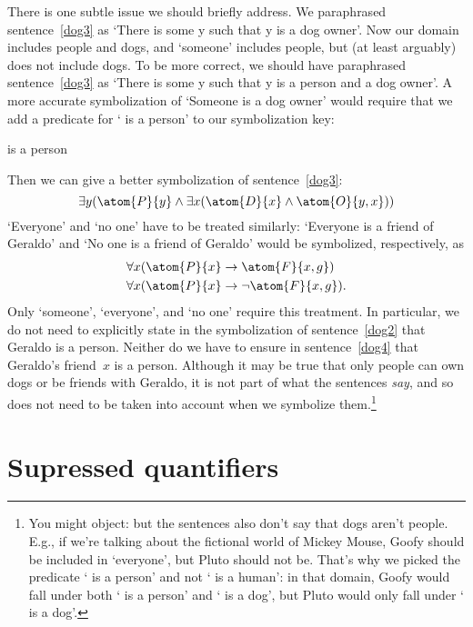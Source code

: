 There is one subtle issue we should briefly address. We paraphrased
sentence~\ref{dog3} as `There is some y such that y is a dog owner'.
Now our domain includes people and dogs, and `someone' includes
people, but (at least arguably) does not include dogs.  To be more
correct, we should have paraphrased sentence~\ref{dog3} as `There is
some y such that y is a person and a dog owner'. A more accurate
symbolization of `Someone is a dog owner' would require that we add a
predicate for `\blank{} is a person' to our symbolization key:
\begin{ekey}
	\item[\atom{P}{x}]  is a person
\end{ekey}
Then we can give a better symbolization of sentence~\ref{dog3}:
$$\exists y (\atom{P}{y} \eand \exists x(\atom{D}{x} \eand
\atom{O}{y,x}))$$
`Everyone' and `no one' have to be treated similarly: `Everyone
is a friend of Geraldo' and `No one is a friend of Geraldo' would be
symbolized, respectively, as
\begin{align*}
	& \forall x(\atom{P}{x} \eif \atom{F}{x,g})\\
	& \forall x(\atom{P}{x} \eif \enot\atom{F}{x,g}).
\end{align*}
Only `someone', `everyone', and `no one' require this treatment. In
particular, we do not need to explicitly state in the symbolization of
sentence~\ref{dog2} that Geraldo is a person. Neither do we have to
ensure in sentence~\ref{dog4} that Geraldo's friend~$x$ is a person.
Although it may be true that only people can own dogs or be friends
with Geraldo, it is not part of what the sentences \emph{say}, and so
does not need to be taken into account when we symbolize
them.\footnote{You might object: but the sentences also don't say that
dogs aren't people. E.g., if we're talking about the fictional world
of Mickey Mouse, Goofy should be included in `everyone', but Pluto
should not be.  That's why we picked the predicate `\blank{} is a
person' and not `\blank{} is a human': in that domain, Goofy would
fall under both `\blank{} is a person' and `\blank{} is a dog', but
Pluto would only fall under `\blank{} is a dog'.}

\section{Supressed quantifiers}\label{ss:SuppQuant}

